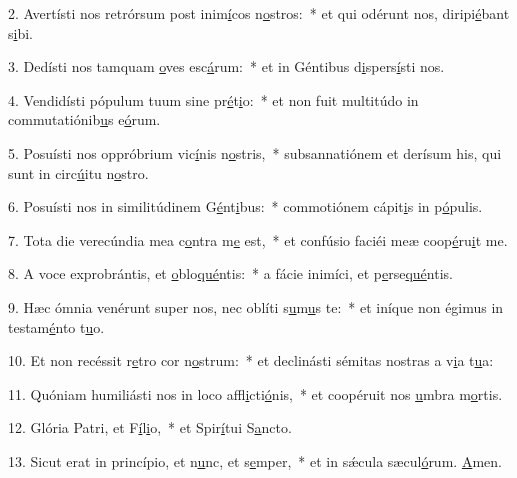 2. Avertísti nos retrórsum post inim\uline{í}cos n\uline{o}stros:~* et qui odérunt nos, diripi\uline{é}bant s\uline{i}bi.\par 
3. Dedísti nos tamquam \uline{o}ves esc\uline{á}rum:~* et in Géntibus d\uline{i}spers\uline{í}sti nos.\par 
4. Vendidísti pópulum tuum sine pr\uline{é}t\uline{i}o:~* et non fuit multitúdo in commutatiónib\uline{u}s e\uline{ó}rum.\par 
5. Posuísti nos oppróbrium vic\uline{í}nis n\uline{o}stris,~* subsannatiónem et derísum his, qui sunt in circ\uline{ú}itu n\uline{o}stro.\par 
6. Posuísti nos in similitúdinem G\uline{é}nt\uline{i}bus:~* commotiónem cápit\uline{i}s in p\uline{ó}pulis.\par 
7. Tota die verecúndia mea c\uline{o}ntra m\uline{e} est,~* et confúsio faciéi meæ coop\uline{é}ru\uline{i}t me.\par 
8. A voce exprobrántis, et \uline{o}blo\uline{qué}ntis:~* a fácie inimíci, et p\uline{e}rse\uline{qué}ntis.\par 
9. Hæc ómnia venérunt super nos, nec oblíti s\uline{u}m\uline{u}s te:~* et iníque non égimus in testam\uline{é}nto t\uline{u}o.\par 
10. Et non recéssit r\uline{e}tro cor n\uline{o}strum:~* et declinásti sémitas nostras a v\uline{i}a t\uline{u}a:\par 
11. Quóniam humiliásti nos in loco affl\uline{i}cti\uline{ó}nis,~* et coopéruit nos \uline{u}mbra m\uline{o}rtis.\par 
12. Glória Patri, et F\uline{í}l\uline{i}o,~* et Spir\uline{í}tui S\uline{a}ncto.\par 
13. Sicut erat in princípio, et n\uline{u}nc, et s\uline{e}mper,~* et in sǽcula sæcul\uline{ó}rum. \uline{A}men.\par 
